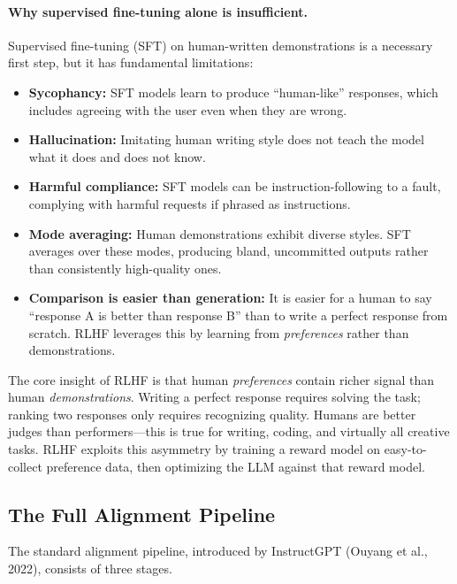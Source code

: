 \paragraph{Why supervised fine-tuning alone is insufficient.}
Supervised fine-tuning (SFT) on human-written demonstrations is a necessary
first step, but it has fundamental limitations:

\begin{itemize}[leftmargin=*]
\item \textbf{Sycophancy:} SFT models learn to produce ``human-like''
  responses, which includes agreeing with the user even when they are wrong.
\item \textbf{Hallucination:} Imitating human writing style does not teach
  the model what it does and does not know.
\item \textbf{Harmful compliance:} SFT models can be instruction-following
  to a fault, complying with harmful requests if phrased as instructions.
\item \textbf{Mode averaging:} Human demonstrations exhibit diverse styles.
  SFT averages over these modes, producing bland, uncommitted outputs rather
  than consistently high-quality ones.
\item \textbf{Comparison is easier than generation:} It is easier for a
  human to say ``response A is better than response B'' than to write a
  perfect response from scratch.  RLHF leverages this by learning from
  \emph{preferences} rather than demonstrations.
\end{itemize}

\begin{keyinsight}
The core insight of RLHF is that human \emph{preferences} contain richer
signal than human \emph{demonstrations}.  Writing a perfect response
requires solving the task; ranking two responses only requires recognizing
quality.  Humans are better judges than performers---this is true for
writing, coding, and virtually all creative tasks.  RLHF exploits this
asymmetry by training a reward model on easy-to-collect preference data,
then optimizing the LLM against that reward model.
\end{keyinsight}

\subsection{The Full Alignment Pipeline}

The standard alignment pipeline, introduced by InstructGPT (Ouyang et al.,
2022), consists of three stages.


